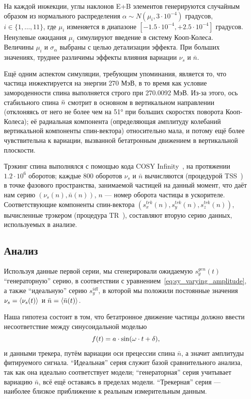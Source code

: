 На каждой инжекции, углы наклонов E+B элементов генерируются случайным образом из
нормального распределения $\alpha\sim N(\mu_i, 3\cdot 10^{-4})$ градусов, $i\in\{1,\dots,11\}$, где
$\mu_i$ изменяется в диапазоне $[-1.5\cdot10^{-4}, +2.5\cdot10^{-4}]$ градусов. Ненулевые ожидания $\mu_i$
симулируют введение в систему Кооп-Колеса.~\cite{Koop:SpinWheel} Величины $\mu_i$ и $\sigma_{\alpha}$
выбраны с целью детализации эффекта. При больших значениях, труднее различимы эффекты влияния вариации
$\nu_s$ и $\bar n$.

Ещё одним аспектом симуляции, требующим упоминания, является то, что частица инжектируется на энергии 270 МэВ, в то время как условие замороденности спина выполняется строго при 270.0092 МэВ. Из-за этого, ось стабильного спина $\bar n$ смотрит в основном в вертикальном направлении (отклоняясь от него не более чем на \ang{51} при больших скоростях поворота Кооп-Колеса); её радиальная компонента (определяющая амплитуду колебаний вертикальной компоненты спин-вектора) относительно мала, и потому ещё более чувствительна к вариации, вызванной бетатронным движением в вертикальной плоскости.

Трэкинг спина выполнялся с помощью кода COSY Infinity~\cite{COSYINF:Website}, на протяжении $1.2\cdot10^6$
оборотов; каждые 800 оборотов $\nu_s$ и $\bar n$ вычисляются (процедурой
TSS~\cite[стр.~41]{COSYINF:Manual:BeamPhys}) в точке фазового пространства, занимаемой частицей на данный момент,
что даёт нам серию $(\nu_s(n), \bar n(n))$, $n$ --- номер оборота частицы в ускорителе.
Соответствующие компоненты спин-вектора $(s_x^{trk}(n), s_y^{trk}(n), s_z^{trk}(n))$,
вычисленные трэкером (процедура TR~\cite[p.~41]{COSYINF:Manual:BeamPhys}), составляют вторую серию данных,
используемых в анализе.

\subsection{Анализ}
Используя данные первой серии, мы сгенерировали ожидаемую $s_y^{gen}(t)$ ``генераторную'' серию,
в соответствии с уравнением~\eqref{eq:sy_varying_amplitude}, а также ``идеальную'' серию $s_y^{idl}$, в которой
мы положили постоянные значения $\nu_s = \avg{\nu_s(t)}$ и $\bar n =\avg{\bar n(t)}$. 

Наша гипотеза состоит в том, что бетатронное движение частицы
должно ввести несоответствие между синусоидальной моделью
\begin{equation}
  f(t) = a\cdot\sin(\omega\cdot t + \delta),\label{eq:fit_model}
\end{equation}
и данными трекера, путём вариации оси прецессии спина $\bar n$, а значит амплитуды
фитируемого сигнала. ``Идеальная'' серия служит базой сравнительного анализа,
так как она идеально соответствует модели; ``генераторная'' серия учитывает вариацию $\bar n$,
всё ещё оставаясь в пределах модели. ``Трекерная'' серия --- наиболее близкое приближение
к реальным измерительным данным.

